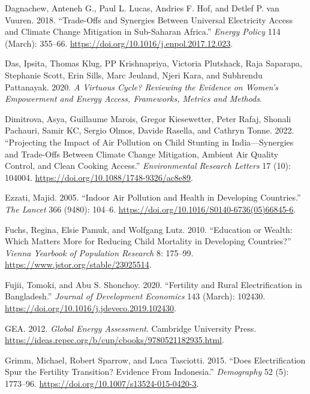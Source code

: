 \documentclass[
]{article}
\newlength{\cslhangindent}
\newlength{\cslentryspacingunit} %
\newenvironment{CSLReferences}[2] %
 {%
  \setlength{\parindent}{0pt}
  \ifodd #1
  \let\oldpar\par
  \def\par{\hangindent=\cslhangindent\oldpar}
  \fi
  \setlength{\parskip}{#2\cslentryspacingunit}
 }%
 {}
\begin{document}
\begin{CSLReferences}{1}{0}
\leavevmode{}%
Dagnachew, Anteneh G., Paul L. Lucas, Andries F. Hof, and Detlef P. van Vuuren. 2018. {``Trade-Offs and Synergies Between Universal Electricity Access and Climate Change Mitigation in {Sub}-{Saharan} {Africa}.''} \emph{Energy Policy} 114 (March): 355--66. \url{https://doi.org/10.1016/j.enpol.2017.12.023}.

\leavevmode{}%
Das, Ipsita, Thomas Klug, PP Krishnapriya, Victoria Plutshack, Raja Saparapa, Stephanie Scott, Erin Sills, Marc Jeuland, Njeri Kara, and Subhrendu Pattanayak. 2020. \emph{A {Virtuous} {Cycle}? {Reviewing} the Evidence on Women's Empowerment and Energy Access, Frameworks, Metrics and Methods}.

\leavevmode{}%
Dimitrova, Asya, Guillaume Marois, Gregor Kiesewetter, Peter Rafaj, Shonali Pachauri, Samir KC, Sergio Olmos, Davide Rasella, and Cathryn Tonne. 2022. {``Projecting the Impact of Air Pollution on Child Stunting in {India}---Synergies and Trade-Offs Between Climate Change Mitigation, Ambient Air Quality Control, and Clean Cooking Access.''} \emph{Environmental Research Letters} 17 (10): 104004. \url{https://doi.org/10.1088/1748-9326/ac8e89}.

\leavevmode{}%
Ezzati, Majid. 2005. {``Indoor Air Pollution and Health in Developing Countries.''} \emph{The Lancet} 366 (9480): 104--6. \url{https://doi.org/10.1016/S0140-6736(05)66845-6}.

\leavevmode{}%
Fuchs, Regina, Elsie Pamuk, and Wolfgang Lutz. 2010. {``Education or Wealth: Which Matters More for Reducing Child Mortality in Developing Countries?''} \emph{Vienna Yearbook of Population Research} 8: 175--99. \url{https://www.jstor.org/stable/23025514}.

\leavevmode{}%
Fujii, Tomoki, and Abu S. Shonchoy. 2020. {``Fertility and Rural Electrification in {Bangladesh}.''} \emph{Journal of Development Economics} 143 (March): 102430. \url{https://doi.org/10.1016/j.jdeveco.2019.102430}.

\leavevmode{}%
GEA. 2012. \emph{Global {Energy} {Assessment}}. Cambridge University Press. \url{https://ideas.repec.org/b/cup/cbooks/9780521182935.html}.

\leavevmode{}%
Grimm, Michael, Robert Sparrow, and Luca Tasciotti. 2015. {``Does {Electrification} {Spur} the {Fertility} {Transition}? {Evidence} {From} {Indonesia}.''} \emph{Demography} 52 (5): 1773--96. \url{https://doi.org/10.1007/s13524-015-0420-3}.


\end{CSLReferences}
\end{document}
